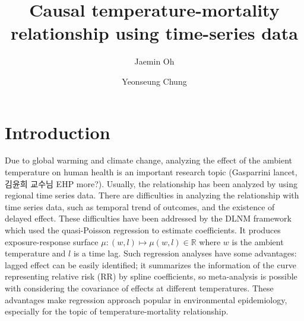 \documentclass[12pt]{article}
\author[1]{Jaemin Oh}
\author[2]{Yeonseung Chung}
\affil[1,2]{Department of Mathematical Sciences, KAIST}
\title{Causal temperature-mortality relationship using time-series data} %
\begin{document}
\maketitle


\section{Introduction}

Due to global warming and climate change,
analyzing the effect of the ambient temperature on human health is an important research topic
\cite{gasparrini2017, yoonhee2019}(Gasparrini lancet, 김윤희 교수님 EHP more?).
Usually, the relationship has been analyzed by using regional time series data.
There are difficulties in analyzing the relationship with time series data, such as 
temporal trend of outcomes, and the existence of delayed effect.
These difficulties have been addressed by the DLNM framework\cite{dlnm2010}
which used the quasi-Poisson regression\cite{quasipoisson} to estimate coefficients.
It produces exposure-response surface
$\mu : (w, l) \mapsto \mu(w,l) \in \mathbb{R}$ where $w$ is the ambient temperature and $l$ is a time lag.
Such regression analyses have some advantages:
lagged effect can be easily identified;
it summarizes the information of the curve representing relative risk (RR) by spline coefficients,
so meta-analysis is possible with considering the covariance of effects at different temperatures.
These advantages make regression approach popular in environmental epidemiology,
especially for the topic of temperature-mortality relationship.
\end{document}
